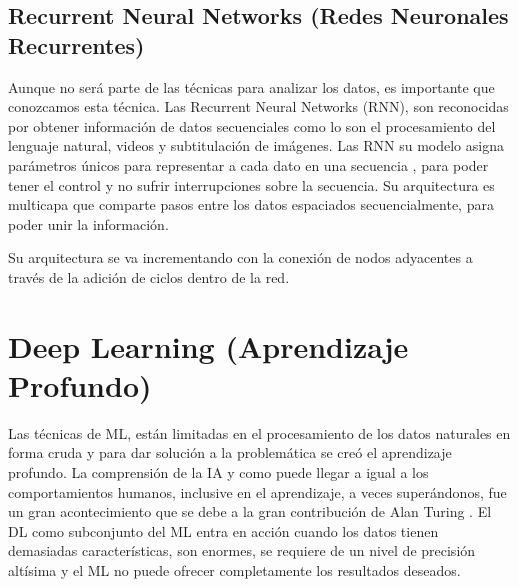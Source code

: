 \doublespacing
\subsection{Recurrent Neural Networks (Redes Neuronales Recurrentes)}
Aunque no será parte de las técnicas para analizar los datos, es importante que conozcamos esta técnica. Las Recurrent Neural Networks (RNN), son reconocidas por obtener información de datos secuenciales como lo son el procesamiento del lenguaje natural, videos y subtitulación de imágenes. Las RNN su modelo asigna parámetros únicos para representar a cada dato en una secuencia \cite{arana2021redes}, para poder tener el control y no sufrir interrupciones sobre la secuencia. Su arquitectura es multicapa que comparte pasos entre los datos espaciados secuencialmente, para poder unir la información.\\
\par Su arquitectura se va incrementando con la conexión de nodos adyacentes a través de la adición de ciclos dentro de la red.\\


\doublespacing
\section{Deep Learning (Aprendizaje Profundo)}
Las técnicas de ML, están limitadas en el procesamiento de los datos naturales en forma cruda y para dar solución a la problemática se creó el aprendizaje profundo. La comprensión de la IA y como puede llegar a igual a los comportamientos humanos, inclusive en el aprendizaje, a veces superándonos, fue un gran acontecimiento que se debe a la gran contribución de Alan Turing \cite{Carola}. El DL como subconjunto del ML entra en acción cuando los datos tienen demasiadas características, son enormes, se requiere de un nivel de precisión altísima y el ML no puede ofrecer completamente los resultados deseados.\\

\doublespacing

